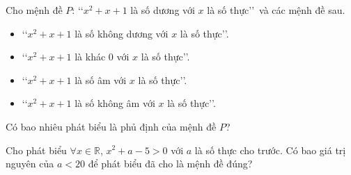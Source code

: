 \documentclass[12pt,a4paper,openany,oneside]{book}
\begin{document}
\begin{bt}%
	Cho mệnh đề $P$: \lq\lq $x^2+x+1$ là số dương với $x$ là số thực\rq\rq\ và các  mệnh đề sau.
	\begin{itemize}
		\item \lq\lq $x^2+x+1$  là số không dương với $x$ là số thực\rq\rq.
		\item \lq\lq $x^2+x+1$ là khác $0$ với $x$ là số thực\rq\rq. 
		\item \lq\lq $x^2+x+1$ là số âm với $x$ là số thực\rq\rq. 
		\item \lq\lq $x^2+x+1$  là số không âm với $x$ là số thực\rq\rq.
	\end{itemize}
	Có bao nhiêu phát biểu là phủ định của mệnh  đề $P$?
\end{bt}

\begin{bt}%
	Cho phát biểu $\forall x\in\mathbb{R}$, $x^{2}+a-5>0$ với $a$ là số thực cho trước. Có bao giá trị  nguyên của $a<20$ để phát biểu đã cho là mệnh đề đúng?
\end{bt}
\end{document}

